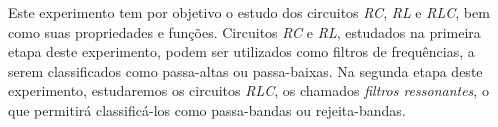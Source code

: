 Este experimento tem por objetivo o estudo dos circuitos \textit{RC}, \textit{RL} e \textit{RLC}, bem como suas propriedades e funções. Circuitos \textit{RC} e \textit{RL}, estudados na primeira etapa deste experimento, podem ser utilizados como filtros de frequências, a serem classificados como passa-altas ou passa-baixas.
Na segunda etapa deste experimento, estudaremos os circuitos \textit{RLC}, os chamados \textit{filtros ressonantes}, o que permitirá classificá-los como passa-bandas ou rejeita-bandas.
